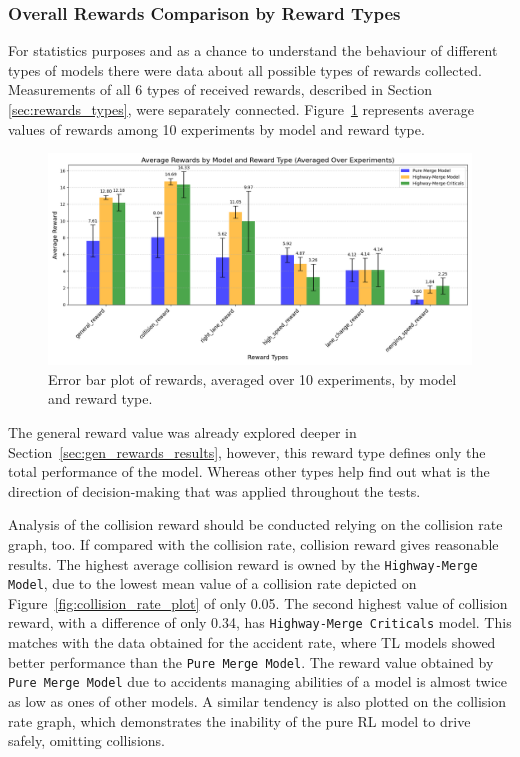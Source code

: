 \subsubsection{Overall Rewards Comparison by Reward Types}\label{sec:overall_reward_types}

For statistics purposes and as a chance to understand the behaviour of different types of models there were data about all possible types of rewards collected. Measurements of all 6 types of received rewards, described in Section \ref{sec:rewards_types}, were separately connected. Figure~\ref{fig:rewards_all} represents average values of rewards among 10 experiments by model and reward type.

\begin{figure}[H]
    \centering
    \includegraphics[width=\textwidth]{images/Rewards.png}
    \caption{Error bar plot of rewards, averaged over 10 experiments, by model and reward type.}
    \label{fig:rewards_all}
\end{figure}

The general reward value was already explored deeper in Section~\ref{sec:gen_rewards_results}, however, this reward type defines only the total performance of the model. Whereas other types help find out what is the direction of decision-making that was applied throughout the tests.

Analysis of the collision reward should be conducted relying on the collision rate graph, too. If compared with the collision rate, collision reward gives reasonable results. The highest average collision reward is owned by the \texttt{Highway-Merge Model}, due to the lowest mean value of a collision rate depicted on Figure~\ref{fig:collision_rate_plot} of only 0.05. The second highest value of collision reward, with a difference of only 0.34, has \texttt{Highway-Merge Criticals} model. This matches with the data obtained for the accident rate, where TL models showed better performance than the \texttt{Pure Merge Model}. The reward value obtained by \texttt{Pure Merge Model} due to accidents managing abilities of a model is almost twice as low as ones of other models. A similar tendency is also plotted on the collision rate graph, which demonstrates the inability of the pure RL model to drive safely, omitting collisions.

